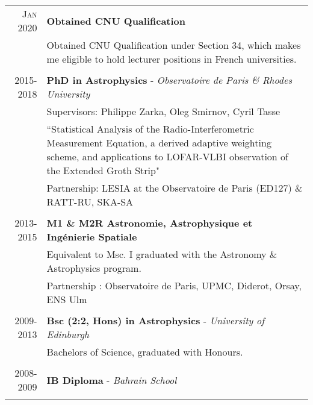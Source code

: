 \documentclass[10pt]{article} %
\begin{document}
\begin{tabular}{r|p{12.5cm}}
	\textsc{Jan 2020} & \textbf{Obtained CNU Qualification}\\
	& Obtained CNU Qualification under Section 34, which makes me eligible to hold lecturer positions in French universities.\\
	\multicolumn{2}{c}{} \\

\textsc{2015-2018} & \textbf{PhD in Astrophysics} - \textit{Observatoire de Paris \& Rhodes University}\\
& Supervisors: Philippe Zarka, Oleg Smirnov, Cyril Tasse\\
& ``Statistical Analysis of the Radio-Interferometric Measurement Equation,
a derived adaptive weighting scheme, and applications to LOFAR-VLBI
observation of the Extended Groth Strip"\\
& Partnership: LESIA at the Observatoire de Paris (ED127) \& RATT-RU, SKA-SA\\
\multicolumn{2}{c}{} \\

\textsc{2013-2015} & \textbf{M1 \& M2R Astronomie, Astrophysique et Ingénierie Spatiale} \\
& Equivalent to Msc. I graduated with the Astronomy \& Astrophysics program.\\
& Partnership : Observatoire de Paris, UPMC, Diderot, Orsay, ENS Ulm\\
\multicolumn{2}{c}{} \\


\textsc{2009-2013} & \textbf{Bsc (2:2, Hons) in Astrophysics} - \textit{University of Edinburgh} \\
& Bachelors of Science, graduated with Honours.\\
\multicolumn{2}{c}{} \\

\textsc{2008-2009} & \textbf{IB Diploma} - \textit{Bahrain School} \\
\multicolumn{2}{c}{} \\

\end{tabular}
\end{document}
